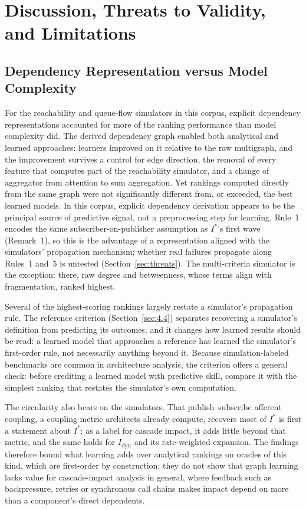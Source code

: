 \section{Discussion, Threats to Validity, and Limitations}
\label{sec:8}

\subsection{Dependency Representation versus Model Complexity}
\label{sec:representation}
\label{sec:restatement}

For the reachability and queue-flow simulators in this corpus, explicit dependency representations accounted for more of the ranking performance than model complexity did. The derived dependency graph enabled both analytical and learned approaches: learners improved on it relative to the raw multigraph, and the improvement survives a control for edge direction, the removal of every feature that computes part of the reachability simulator, and a change of aggregator from attention to sum aggregation. Yet rankings computed directly from the same graph were not significantly different from, or exceeded, the best learned models. In this corpus, explicit dependency derivation appears to be the principal source of predictive signal, not a preprocessing step for learning. Rule~1 encodes the same subscriber-on-publisher assumption as $I^*$'s first wave (Remark~1), so this is the advantage of a representation aligned with the simulators' propagation mechanism; whether real failures propagate along Rules~1 and~5 is untested (Section~\ref{sec:threats}). The multi-criteria simulator is the exception: there, raw degree and betweenness, whose terms align with fragmentation, ranked highest.

Several of the highest-scoring rankings largely restate a simulator's propagation rule. The reference criterion (Section~\ref{sec:4.4}) separates recovering a simulator's definition from predicting its outcomes, and it changes how learned results should be read: a learned model that approaches a reference has learned the simulator's first-order rule, not necessarily anything beyond it. Because simulation-labeled benchmarks are common in architecture analysis, the criterion offers a general check: before crediting a learned model with predictive skill, compare it with the simplest ranking that restates the simulator's own computation.

The circularity also bears on the simulators. That publish--subscribe afferent coupling, a coupling metric architects already compute, recovers most of $I^*$ is first a statement about $I^*$: as a label for cascade impact, it adds little beyond that metric, and the same holds for $I_{\text{dyn}}$ and its rate-weighted expansion. The findings therefore bound what learning adds over analytical rankings on oracles of this kind, which are first-order by construction; they do not show that graph learning lacks value for cascade-impact analysis in general, where feedback such as backpressure, retries or synchronous call chains makes impact depend on more than a component's direct dependents.

